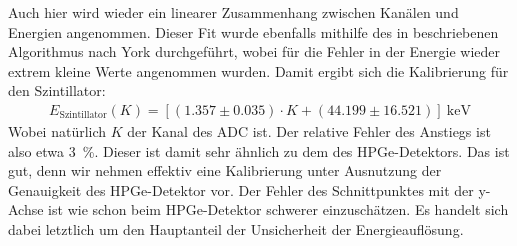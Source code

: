 Auch hier wird wieder ein linearer Zusammenhang zwischen Kanälen und Energien angenommen. Dieser Fit wurde ebenfalls mithilfe des in \cite{Fit_bivariate} beschriebenen Algorithmus nach York durchgeführt, wobei für die Fehler in der Energie wieder extrem kleine Werte angenommen wurden.
Damit ergibt sich die Kalibrierung für den Szintillator:
\begin{gather}
    E_{\text{Szintillator}} (K) = [(1.357 \pm 0.035) \cdot K + (44.199 \pm 16.521)] \ \si{\kilo\electronvolt}
\end{gather}
Wobei natürlich $K$ der Kanal des ADC ist.
Der relative Fehler des Anstiegs ist also etwa \SI{3}{\percent}.
Dieser ist damit sehr ähnlich zu dem des HPGe-Detektors.
Das ist gut, denn wir nehmen effektiv eine Kalibrierung unter Ausnutzung der Genauigkeit des HPGe-Detektor vor.
Der Fehler des Schnittpunktes mit der y-Achse ist wie schon beim HPGe-Detektor schwerer einzuschätzen.
Es handelt sich dabei letztlich um den Hauptanteil der Unsicherheit der Energieauflösung.
